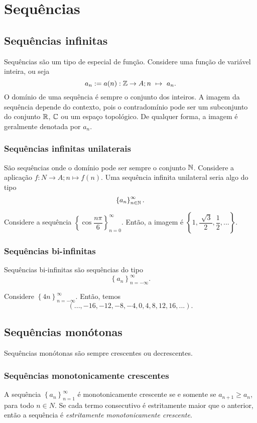 \section{Sequências}
   \subsection{Sequências infinitas}
      Sequências são um tipo de especial de função. Considere uma função de variável inteira, ou seja $$a_{n} := a(n): \mathbb{Z} \to A; n\ \mapsto\ a_{n}.$$
      O domínio de uma sequência é sempre o conjunto dos inteiros. A imagem da sequência depende do contexto, pois o contradomínio pode ser um subconjunto do conjunto $\mathbb{R}$, $\mathbb{C}$ ou um espaço topológico. 
      De qualquer forma, a imagem é geralmente denotada por $a_{n}$.
      \subsubsection{Sequências infinitas unilaterais}
          São sequências onde o domínio pode ser sempre o conjunto $\mathbb{N}$. Considere a aplicação $f: N \to A; n \mapsto f(n).$ Uma sequência infinita unilateral seria algo do tipo $$\left\{a_{n}\right\}^{\infty}_{n \in \mathbb{N}}.$$
         \begin{exmp}
            Considere a sequência $\left\{\cos{\dfrac{n\pi}{6}}\right\}^{\infty}_{n=0}$. Então, a imagem é $\left\{1,\dfrac{\sqrt[]{3}}{2}, \dfrac{1}{2}, ...\right\}.$
         \end{exmp}
      
      \subsubsection{Sequências bi-infinitas}
         Sequências bi-infinitas são sequências do tipo $$\left\{a_{n}\right\}^{\infty}_{n=-\infty}.$$
         \begin{exmp}
            Considere $\left\{4n\right\}^{\infty}_{n=-\infty}$. Então, temos $$(..., -16,-12,-8,-4,0,4,8,12,16,...).$$
         \end{exmp}
   \subsection{Sequências monótonas}
      Sequências monótonas são sempre crescentes ou decrescentes. 
         \subsubsection{Sequências monotonicamente crescentes}
               A sequência $\left\{a_{n}\right\}^{\infty}_{n=1}$ é monotonicamente crescente se e somente se $a_{n+1} \geq a_{n}$, para todo $n \in N$. 
               Se cada termo consecutivo é estritamente maior que o anterior, então a sequência é \emph{estritamente monotonicamente crescente}.
